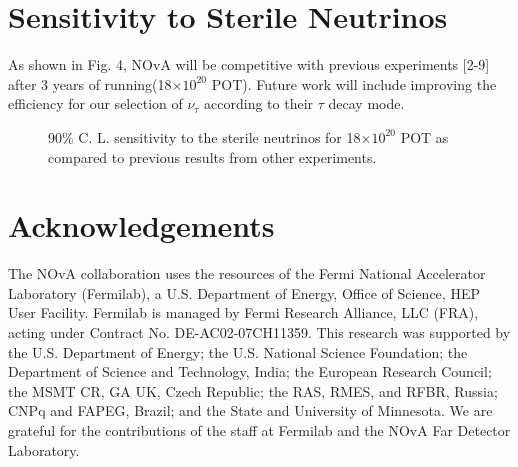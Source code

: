 \documentclass[12pt]{article}
\begin{document}

%
%



\section{Sensitivity to Sterile Neutrinos}
As shown in Fig. 4, NOvA will be competitive with previous experiments [2-9] after 3 years of running(18$\times10^{20}$ POT). Future work will include improving the efficiency for our selection of $\nu_{\tau}$ according to their $\tau$ decay mode.
%
%
\begin{figure}[H]
\begin{center}
\caption{90\% C. L. sensitivity to the sterile neutrinos for 18$\times10^{20}$ POT  as compared to previous results from other experiments.}
\label{fig:magnet}
\end{center}
\end{figure}

\section{Acknowledgements}
The NOvA collaboration uses the resources of the Fermi National Accelerator Laboratory (Fermilab), a U.S. Department of Energy, Office of Science, HEP User Facility. Fermilab is managed by Fermi Research Alliance, LLC (FRA), acting under Contract No. DE-AC02-07CH11359. This research was supported by the U.S. Department of Energy; the U.S. National Science Foundation; the Department of Science and Technology, India; the European Research Council; the MSMT CR, GA UK, Czech Republic; the RAS, RMES, and RFBR, Russia; CNPq and FAPEG, Brazil; and the State and University of Minnesota. We are grateful for the contributions of the staff at Fermilab and the NOvA Far Detector Laboratory.
\end{document}
